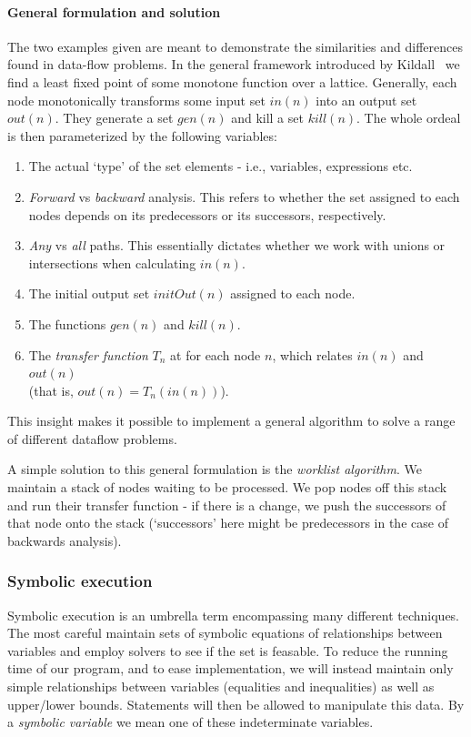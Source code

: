 \documentclass[12pt,a4paper]{article}
\begin{document}
\begin{enumerate}
\paragraph{General formulation and solution}\label{par:general}
The two examples given are meant to demonstrate the similarities and differences found in data-flow problems. In the general framework introduced by Kildall~\citep{kildall} we find a least fixed point of some monotone function over a lattice.
Generally, each node monotonically transforms some input set $in(n)$ into an output set $out(n)$. They generate a set $gen(n)$ and kill a set $kill(n)$. The whole ordeal is then 
parameterized by the following variables:
\begin{enumerate}
  \item The actual `type' of the set elements - i.e., variables, expressions etc.
  \item \textit{Forward} vs \textit{backward} analysis. This refers to whether the set assigned to each nodes depends on its predecessors or its successors, respectively.
  \item \textit{Any} vs \textit{all} paths. This essentially dictates whether we work with unions or intersections when calculating $in(n)$.
  \item The initial output set $initOut(n)$ assigned to each node.
  \item The functions $gen(n)$ and $kill(n)$.
  \item The \textit{transfer function} $T_n$ at for each node $n$, which relates $in(n)$ and $out(n)$ \\(that is, $out(n) = T_n(in(n))$).
\end{enumerate}
This insight makes it possible to implement a general algorithm to solve a range of different dataflow problems.\par
A simple solution to this general formulation is the \textit{worklist algorithm}. We maintain a stack of nodes waiting to be processed. We pop nodes off this stack
and run their transfer function - if there is a change, we push the successors of that node onto the stack (`successors' here might be predecessors in the case of
backwards analysis).

\subsubsection{Symbolic execution}
Symbolic execution is an umbrella term encompassing many different techniques. The most careful maintain sets of symbolic equations of relationships between variables and employ solvers to see if the set is feasable. To reduce the running time of our program, and to ease implementation, we will instead maintain only simple relationships between variables (equalities and inequalities) as well as upper/lower bounds. Statements will then be allowed to manipulate this data. By a \textit{symbolic variable} we mean one of these indeterminate variables.


\end{enumerate}
\end{document}
